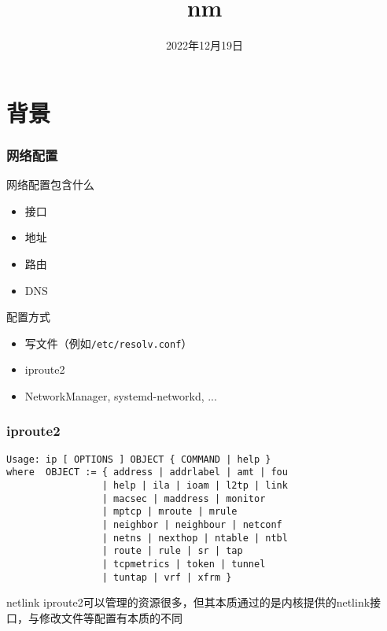 \documentclass{ctexbeamer}
\title{nm}
\date{2022年12月19日}
\begin{document}
\frame{\titlepage}

\section{背景}
\begin{frame}
\frametitle{网络配置}
\begin{block}{网络配置包含什么}
\begin{itemize}
\item 接口
\item 地址
\item 路由
\item DNS
\end{itemize}
\end{block}
\begin{exampleblock}{配置方式}
\begin{itemize}
\item 写文件（例如\texttt{/etc/resolv.conf}）
\item iproute2
\item NetworkManager, systemd-networkd, ...
\end{itemize}
\end{exampleblock}
\end{frame}

\begin{frame}[fragile]
\frametitle{iproute2}
\begin{verbatim}
Usage: ip [ OPTIONS ] OBJECT { COMMAND | help }
where  OBJECT := { address | addrlabel | amt | fou
                 | help | ila | ioam | l2tp | link
                 | macsec | maddress | monitor
                 | mptcp | mroute | mrule
                 | neighbor | neighbour | netconf
                 | netns | nexthop | ntable | ntbl
                 | route | rule | sr | tap
                 | tcpmetrics | token | tunnel
                 | tuntap | vrf | xfrm }
\end{verbatim}
\begin{alertblock}{netlink}
iproute2可以管理的资源很多，但其本质通过的是内核提供的netlink接口，与修改文件等配置有本质的不同
\end{alertblock}
\end{frame}
\end{document}
